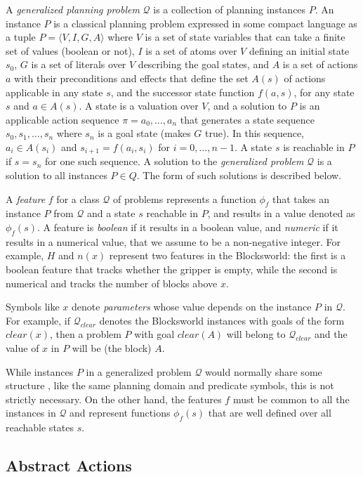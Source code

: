 \documentclass[letterpaper]{article} %
\newcommand{\tup}[1]{\langle #1 \rangle}
\newcommand{\Q}{\mathcal{Q}}
\begin{document}
A \emph{generalized planning problem} $\Q$ is a collection of planning instances $P$.
An instance $P$ is a  classical planning problem expressed in some compact language
as a tuple $P=\tup{V,I,G,A}$ where $V$ is a set of state variables that can take a
finite set of values (boolean or not), $I$ is a set of atoms over $V$ defining an
initial state $s_0$, $G$ is a set of literals over $V$ describing the goal
states, and $A$ is a set of actions $a$ with their preconditions and effects that
define the set $A(s)$ of actions applicable in any state $s$, and the successor
state function $f(a,s)$, for any state $s$ and $a \in A(s)$.
A state is a valuation over $V$, and a solution to $P$ is an applicable action
sequence $\pi=a_0,\ldots,a_n$ that generates  a state sequence $s_0,s_1,\ldots,s_{n}$
where $s_n$ is a goal state (makes $G$ true). In this sequence, $a_i \in A(s_i)$
and $s_{i+1}=f(a_i,s_i)$ for $i=0, \ldots, n-1$. A state $s$ is reachable in $P$
if $s=s_n$ for one such sequence. A solution to the \emph{generalized problem}
$\Q$ is a solution to all instances $P \in Q$. The form of such solutions is
described below.

A \emph{feature} $f$ for a class $\Q$ of problems represents a function $\phi_f$
that takes an   instance $P$ from $\Q$ and a state $s$ reachable in $P$, and results
in a value denoted as $\phi_f(s)$. 
A feature is \emph{boolean} if it results in a boolean value, and \emph{numeric}
if it results in a numerical value, that we assume to be a non-negative integer.
For example, $H$ and $n(x)$ represent two features in the Blocksworld:
the first is a boolean feature that tracks whether the gripper is empty, while
the second is numerical and tracks the number of blocks above $x$. 

Symbols like $x$ denote \emph{parameters} whose value depends on the
instance $P$ in $\Q$. For example, if $\Q_{clear}$ denotes the Blocksworld
instances with goals of the form $clear(x)$, then a problem 
$P$ with goal $clear(A)$ will belong to $\Q_{clear}$ and 
the value of $x$ in $P$ will be (the block) $A$.

While instances $P$ in a generalized problem $\Q$ would normally share some structure \cite{bonet:ijcai2015},
like the same planning domain and predicate symbols, this is not strictly  necessary.
On the other hand,  the features $f$  must be common to all the instances  in $\Q$ and 
represent functions $\phi_f(s)$ that are well defined over all reachable states $s$.


\subsection{Abstract Actions}
\end{document}
